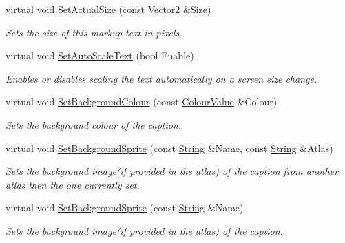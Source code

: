 \begin{DoxyCompactItemize}
virtual void \hyperlink{classMezzanine_1_1UI_1_1MarkupText_ab5e6b9c794dc7e98ba13c571287742da}{SetActualSize} (const \hyperlink{classMezzanine_1_1Vector2}{Vector2} \&Size)
\begin{DoxyCompactList}\small\item\em Sets the size of this markup text in pixels. \item\end{DoxyCompactList}\item 
virtual void \hyperlink{classMezzanine_1_1UI_1_1MarkupText_a3b605ec081d188cae19ed3e677f65072}{SetAutoScaleText} (bool Enable)
\begin{DoxyCompactList}\small\item\em Enables or disables scaling the text automatically on a screen size change. \item\end{DoxyCompactList}\item 
virtual void \hyperlink{classMezzanine_1_1UI_1_1MarkupText_a6fcd1660b01937b93d916dcbf0353618}{SetBackgroundColour} (const \hyperlink{classMezzanine_1_1ColourValue}{ColourValue} \&Colour)
\begin{DoxyCompactList}\small\item\em Sets the background colour of the caption. \item\end{DoxyCompactList}\item 
virtual void \hyperlink{classMezzanine_1_1UI_1_1MarkupText_a9b6b97b8476de179430425f86aaefd57}{SetBackgroundSprite} (const \hyperlink{namespaceMezzanine_acf9fcc130e6ebf08e3d8491aebcf1c86}{String} \&Name, const \hyperlink{namespaceMezzanine_acf9fcc130e6ebf08e3d8491aebcf1c86}{String} \&Atlas)
\begin{DoxyCompactList}\small\item\em Sets the background image(if provided in the atlas) of the caption from another atlas then the one currently set. \item\end{DoxyCompactList}\item 
virtual void \hyperlink{classMezzanine_1_1UI_1_1MarkupText_a6afd13748866d573edb97eb48c1309b1}{SetBackgroundSprite} (const \hyperlink{namespaceMezzanine_acf9fcc130e6ebf08e3d8491aebcf1c86}{String} \&Name)
\begin{DoxyCompactList}\small\item\em Sets the background image(if provided in the atlas) of the caption. \item\end{DoxyCompactList}\item 

\end{DoxyCompactItemize}
